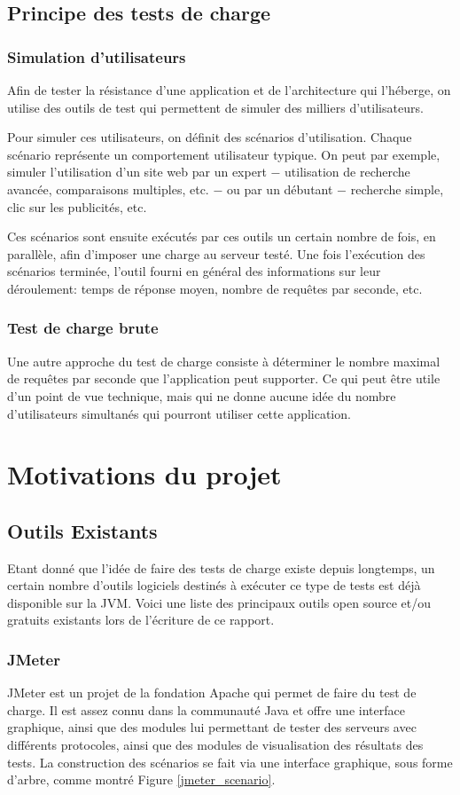\subsection{Principe des tests de charge}
\subsubsection{Simulation d'utilisateurs}
Afin de tester la résistance d'une application et de l'architecture qui l'héberge, on utilise des outils de test qui permettent de simuler des milliers d'utilisateurs.

Pour simuler ces utilisateurs, on définit des scénarios d'utilisation. Chaque scénario représente un comportement utilisateur typique. On peut par exemple, simuler l'utilisation d'un site web par un expert $-$ utilisation de recherche avancée, comparaisons multiples, etc. $-$ ou par un débutant $-$ recherche simple, clic sur les publicités, etc.

Ces scénarios sont ensuite exécutés par ces outils un certain nombre de fois, en parallèle, afin d'imposer une charge au serveur testé. Une fois l'exécution des scénarios terminée, l'outil fourni en général des informations sur leur déroulement: temps de réponse moyen, nombre de requêtes par seconde, etc.

\subsubsection{Test de charge brute}
Une autre approche du test de charge consiste à déterminer le nombre maximal de requêtes par seconde que l'application peut supporter. Ce qui peut être utile d'un point de vue technique, mais qui ne donne aucune idée du nombre d'utilisateurs simultanés qui pourront utiliser cette application.

\section{Motivations du projet}
\subsection{Outils Existants}
Etant donné que l'idée de faire des tests de charge existe depuis longtemps, un certain nombre d'outils logiciels destinés à exécuter ce type de tests est déjà disponible sur la JVM. Voici une liste des principaux outils open source et/ou gratuits existants lors de l'écriture de ce rapport.

\subsubsection{JMeter} 
JMeter\cite{www_jmeter} est un projet de la fondation Apache qui permet de faire du test de charge. Il est assez connu dans la communauté Java et offre une interface graphique, ainsi que des modules lui permettant de tester des serveurs avec différents protocoles, ainsi que des modules de visualisation des résultats des tests. La construction des scénarios se fait via une interface graphique, sous forme d'arbre, comme montré Figure \ref{jmeter_scenario}.

